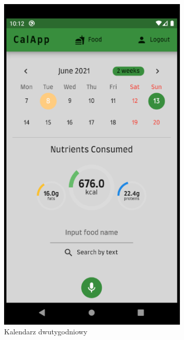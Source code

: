 \documentclass[12pt, a4paper]{article}
\begin{document}
\begin{sloppypar}
{{\begin{figure}[H]
\begin{subfigure}{.33\textwidth}
        \includegraphics[width=.95\linewidth]{screen_home_calendar2.PNG}
        \caption{Kalendarz dwutygodniowy}
        \label{fig:screen_calendar2}
      \end{subfigure}%
      \begin{subfigure}{.33\textwidth}
        \centering

\end{subfigure}
\end{figure}}}
\end{sloppypar}
\end{document}
